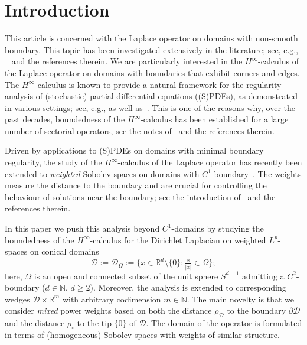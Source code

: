 \documentclass[12pt,a4paper, reqno]{amsart}
\theoremstyle{plain}
\theoremstyle{definition}
\theoremstyle{remark}
\numberwithin{equation}{section}
\newcommand{\1}{\mathbbm{1}}
\newcommand{\R}{\ensuremath{\mathbb{R}}}
\newcommand{\N}{\ensuremath{\mathbb{N}}}
\newcommand{\calD}{\ensuremath{\mathcal{D}}}
\begin{document}
\maketitle

{\hypersetup{linkcolor=black}\tableofcontents} 
    
\section{Introduction}
This article is concerned with the Laplace operator on domains with non-smooth boundary. This topic has been investigated extensively in the literature; see, e.g.,
~\cite{BorKon2006, Dau1988,KozMazRos1997,Kozlov2014TheDP,MazRos2010,Nazarov2001,Prss2007HinftycalculusFT, Sol2001} and the references therein.
We are particularly interested in the $H^\infty$-calculus of the Laplace operator on domains with boundaries that exhibit corners and edges.
The $H^\infty$-calculus is known to provide a natural framework for the regularity analysis of (stochastic) partial differential equations ((S)PDEs), as demonstrated in various settings; see, e.g., \cite{DenkDoreHieberPruesVenni_2004, DenKai2013, KalKunWei2006,KunWei2017,PrssSimonett2016,Weis2006} as well as~\cite{AgrestiVeraar2022a,AgrVer2025,NeeVerWei2012,NeeVerWei2012b}.
This is one of the reasons why, over the past decades, boundedness of the $H^\infty$-calculus has been established for a large number of sectorial operators, see the notes of~\cite[Chapter~10]{aibs2} and the references therein.

Driven by applications to (S)PDEs on domains with minimal boundary regularity, the study of the $H^\infty$-calculus of the Laplace operator has recently been extended to  \emph{weighted} Sobolev spaces on domains with $C^1$-boundary~\cite{Lindemulder2024functionalcalculusweightedsobolev, lindemulder2025functionalcalculusweightedsobolev, LindemulderVeraar2020}. The weights measure the distance to the boundary and are crucial for controlling the behaviour of solutions near the boundary; see the introduction of~\cite{lindemulder2025functionalcalculusweightedsobolev} and the references therein.

In this paper we push this analysis beyond $C^1$-domains by studying the boundedness of the $H^\infty$-calculus for  the  Dirichlet Laplacian on weighted $L^p$-spaces on conical domains
\begin{equation}\label{eq:D:intro}
\calD 
:=
\calD_\Omega
:=
\{x\in\R^d\setminus\{0\}\colon \tfrac{x}{|x|}\in \Omega\}; 
\end{equation}
here,  $\Omega$ is an open and connected subset of the unit sphere $S^{d-1}$ admitting a $C^2$-boundary ($d\in\N$, $d\geq 2$). Moreover, the analysis is extended to corresponding wedges $\calD\times\R^m$ with arbitrary codimension $m\in\N$.
The main novelty is that we consider \emph{mixed} power weights based on both the distance $\rho_\calD$ to the boundary $\partial\calD$ and the distance $\rho_\circ$ to the tip $\{0\}$ of $\calD$.
The domain of the operator is formulated in terms of (homogeneous) Sobolev spaces with weights of similar structure.
\end{document}
